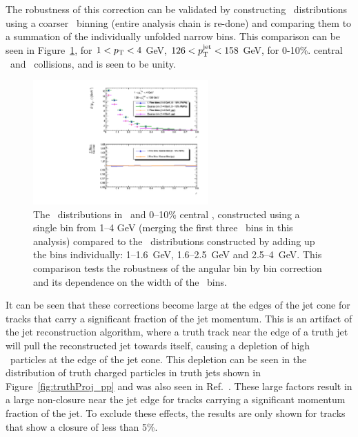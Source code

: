 The robustness of this correction can be validated by constructing \Dptr\ distributions using a coarser \pt\ binning (entire analysis chain is re-done) and comparing them to a summation of the individually unfolded narrow bins.
This comparison can be seen in Figure~\ref{fig:MergedBinCheck}, for $1 < \mbox{$p_{\mathrm{T}}$} < 4$ GeV, $126 < \mbox{$p_{\mathrm{T}}^{\mathrm{jet}}$} < 158$ GeV,  for 0-10\%.
central \pbpb\ and \pp\ collisions, and is seen to be unity.

\begin{figure}
\centering
\includegraphics[width=0.6\textwidth]{figures/main/general/MergedBinCheck.pdf}
\caption{The \Dptr\ distributions in \pp\ and 0--10\% central \pbpb, constructed using a single bin from 1--4 GeV (merging the first three \pt\ bins in this analysis) compared to the \Dptr\ distributions constructed by adding up the bins individually: \mbox{1--1.6 GeV}, \mbox{1.6--2.5 GeV} and \mbox{2.5--4 GeV}.
This comparison tests the robustness of the angular bin by bin correction and its dependence on the width of the \pt\ bins.}
\label{fig:MergedBinCheck}
\end{figure}


It can be seen that these corrections become large at the edges of the jet cone for tracks that carry a significant fraction of the jet momentum.
This is an artifact of the jet reconstruction algorithm, where a truth track near the edge of a truth jet will pull the reconstructed jet towards itself, causing a depletion of high \pt\ particles at the edge of the jet cone.
This depletion can be seen in the distribution of truth charged particles in truth jets shown in Figure~\ref{fig:truthProj_pp} and was also seen in Ref.~\cite{Choudalakis:1248716}.
These large factors result in a large non-closure near the jet edge for tracks carrying a significant momentum fraction of the jet.
To exclude these effects, the results are only shown for tracks that show a closure of less than 5\%.

